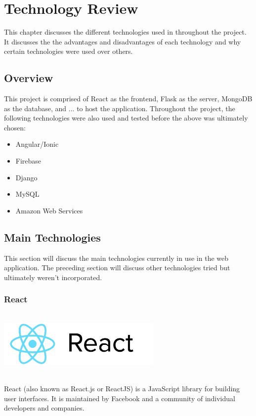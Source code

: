 \chapter{Technology Review}
This chapter discusses the different technologies used in throughout the project. It discusses the the advantages and disadvantages of each technology and why certain technologies were used over others.

\section{Overview}
This project is comprised of React as the frontend, Flask as the server, MongoDB as the database, and ... to host the application. Throughout the project, the following technologies were also used and tested before the above was ultimately chosen:
\begin{itemize}
    \item Angular/Ionic
    \item Firebase
    \item Django
    \item MySQL
    \item Amazon Web Services
\end{itemize}

\section{Main Technologies}
This section will discuss the main technologies currently in use in the web application. The preceding section will discuss other technologies tried but ultimately weren't incorporated. 

\newpage

\subsection{React}
\par
\medskip
\begin{center}
    \includegraphics[width=8cm,height=3.3cm,keepaspectratio]{images/react}
\end{center}
React (also known as React.js or ReactJS) is a JavaScript library for building user interfaces. It is maintained by Facebook and a community of individual developers and companies.

